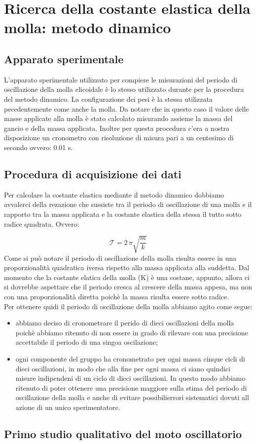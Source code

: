 \section{Ricerca della costante elastica della molla: metodo dinamico}

\subsection{Apparato sperimentale}
L'apparato sperimentale utilizzato per compiere le misurazioni del periodo di oscillazione della molla elicoidale è lo stesso utilizzato durante per la procedura del metodo dinamico. La configurazione dei pesi è la stessa utilizzata pecedentemente come anche la molla. Da notare che in questo caso il valore delle masse applicate alla molla è stato calcolato misurando assieme la massa del gancio e della massa applicata. Inoltre per questa procedura c'era a nostra disposizione un cronometro con risoluzione di misura pari a un centesimo di secondo ovvero: 0.01 s.

\subsection{Procedura di acquisizione dei dati}
Per calcolare la costante elastica mediante il metodo dinamico dobbiamo avvalerci della rezazione che sussiste tra il periodo di oscillazione di una molla e il rapporto tra la massa applicata e la costante elastica della stessa il tutto sotto radice quadrata. Ovvero:

\begin{equation}
	\mathcal{T} = {2\,\pi}{\sqrt{\frac{m}{k}}}
\end{equation}
Come si può notare il periodo di oscillazione della molla risulta essere in una proporzionalità quadratica iversa rispetto alla massa applicata alla suddetta. Dal momento che la costante elatica della molla (K) è una costane, appunto, allora ci si dovrebbe aspettare che il periodo cresca al crescere della massa appesa, ma non con una proporzionalità diretta poichè la massa risulta essere sotto radice.\\
Per ottenere quidi il periodo di oscillazione della molla abbiamo agito come segue:
\begin{itemize}
	\item{abbiamo deciso di cronometrare il perido di dieci oscillazioni della molla poichè abbiamo ritenuto di non essere in grado di rilevare con una precisione accettabile il periodo di una singoa oscilazione;}
	\item{ogni componente del gruppo ha cronometrato per ogni massa cinque cicli di dieci oscillazioni, in modo che alla fine per ogni massa ci siano quindici misure indipendeni di un ciclo di dieci oscillazioni. In questo modo abbiamo ritenuto di poter ottenere una precisione maggiore sulla stima del periodo di oscillazione della molla e anche di evitare possibilierrori sistematici dovuti all azione di un unico sperimentatore.}
\end{itemize} 


\subsection{Primo studio qualitativo del moto oscillatorio}